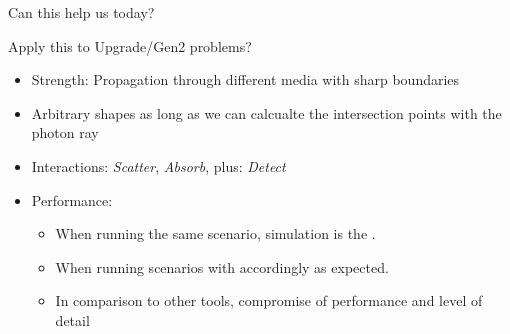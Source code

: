 
\begin{frame}[fragile]{Can this help us today?}

  Apply this to Upgrade/Gen2 problems?

  \begin{itemize}
    \item Strength: Propagation through \alert{different media with sharp boundaries}
    \item \alert{Arbitrary shapes} as long as we can calcualte the intersection points with the photon ray
    \item Interactions: \textit{Scatter}, \textit{Absorb}, \alert{plus: \textit{Detect}}
    \item Performance:
    \begin{itemize}
      \item When running the same scenario, simulation  is the . \checkmark
      \item When running scenarios with  accordingly as expected.
      \item In comparison to other tools, \alert{compromise} of \alert{performance} and \alert{level of detail}
    \end{itemize}
  \end{itemize}

\end{frame}
